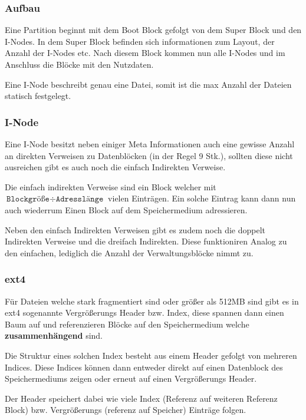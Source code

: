 \documentclass[10pt,a4paper]{article}
\begin{document}
\begin{multicols*}{4}
\subsubsection*{Aufbau}

Eine Partition beginnt mit dem Boot Block gefolgt von dem Super Block und den I-Nodes. In dem Super Block befinden sich
informationen zum Layout, der Anzahl der I-Nodes etc. Nach diesem Block kommen nun alle I-Nodes und im Anschluss die
Blöcke mit den Nutzdaten.

Eine I-Node beschreibt genau eine Datei, somit ist die max Anzahl der Dateien statisch festgelegt.

\subsubsection*{I-Node}
Eine I-Node besitzt neben einiger Meta Informationen auch eine gewisse Anzahl an direkten Verweisen zu Datenblöcken (in
der Regel 9 Stk.), sollten diese nicht ausreichen gibt es auch noch die einfach Indirekten Verweise.

Die einfach indirekten Verweise sind ein Block welcher mit \(\texttt{Blockgröße} \div \texttt{Adresslänge}\) vielen
Einträgen. Ein solche Eintrag kann dann nun auch wiederrum Einen Block auf dem Speichermedium adressieren.

Neben den einfach Indirekten Verweisen gibt es zudem noch die doppelt Indirekten Verweise und die dreifach Indirekten.
Diese funktioniren Analog zu den einfachen, lediglich die Anzahl der Verwaltungsblöcke nimmt zu.

\subsubsection*{ext4}
Für Dateien welche stark fragmentiert sind oder größer als 512MB sind gibt es in ext4 sogenannte Vergrößerungs Header
bzw. Index, diese spannen dann einen Baum auf und referenzieren Blöcke auf den Speichermedium welche
\textbf{zusammenhängend} sind.

Die Struktur eines solchen Index besteht aus einem Header gefolgt von mehreren Indices. Diese Indices können dann
entweder direkt auf einen Datenblock des Speichermediums zeigen oder erneut auf einen Vergrößerungs Header.

Der Header speichert dabei wie viele Index (Referenz auf weiteren Referenz Block) bzw. Vergrößerungs (referenz auf
Speicher) Einträge folgen.

\end{multicols*}
\end{document}
